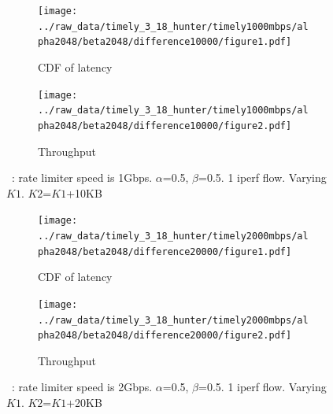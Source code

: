 \begin{figure}
\centering
 \begin{subfigure}[b]{0.8\columnwidth}
 \centering
 \texttt{[image: ../raw\_data/timely\_3\_18\_hunter/timely1000mbps/alpha2048/beta2048/difference10000/figure1.pdf]}
 \caption{CDF of latency}
 \end{subfigure}
 \begin{subfigure}[b]{0.8\columnwidth}
 \centering
 \texttt{[image: ../raw\_data/timely\_3\_18\_hunter/timely1000mbps/alpha2048/beta2048/difference10000/figure2.pdf]}
 \caption{Throughput}
 \end{subfigure}
\caption{~\spring: rate limiter speed is 1Gbps. $\alpha$=0.5, $\beta$=0.5. 1 iperf flow. Varying $K1$. $K2$=$K1$+10KB}
\label{timely-1iperf-1gbps}
\end{figure}

\begin{figure}
\centering
 \begin{subfigure}[b]{0.8\columnwidth}
 \centering
 \texttt{[image: ../raw\_data/timely\_3\_18\_hunter/timely2000mbps/alpha2048/beta2048/difference20000/figure1.pdf]}
 \caption{CDF of latency}
 \end{subfigure}
 \begin{subfigure}[b]{0.8\columnwidth}
 \centering
 \texttt{[image: ../raw\_data/timely\_3\_18\_hunter/timely2000mbps/alpha2048/beta2048/difference20000/figure2.pdf]}
 \caption{Throughput}
 \end{subfigure}
\caption{~\spring: rate limiter speed is 2Gbps. $\alpha$=0.5, $\beta$=0.5. 1 iperf flow. Varying $K1$. $K2$=$K1$+20KB}
\label{timely-1iperf-2gbps}
\end{figure}

\fi
